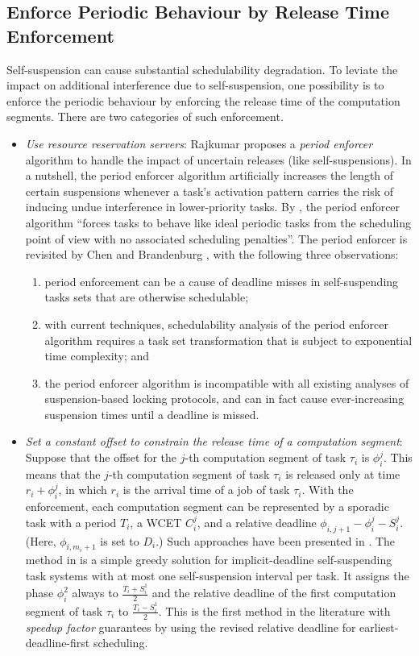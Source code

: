 \begin{table}[t]
\begin{table}[t]
\subsection{Enforce Periodic Behaviour by Release Time Enforcement}   Self-suspension can cause substantial schedulability degradation. To leviate the impact on additional interference due to self-suspension, one possibility is to enforce the periodic behaviour by enforcing the release time of the computation segments. There are two categories of such enforcement. 
  \begin{itemize}
  \item {\it Use resource reservation servers}: Rajkumar \cite{Raj:suspension1991} proposes a \emph{period enforcer} algorithm to handle the impact of uncertain releases (like self-suspensions). In a nutshell, the period enforcer algorithm artificially increases the length of certain suspensions whenever a task's activation pattern carries the risk of inducing undue interference in lower-priority tasks. By \cite{Raj:suspension1991}, the period enforcer algorithm ``forces tasks to behave like ideal periodic tasks from the scheduling point of view with no associated scheduling penalties''. The period enforcer is revisited by Chen and Brandenburg \cite{ChenBrandenburg}, with the following three observations:
\begin{enumerate}
	\item period enforcement can be a cause of deadline misses in self-suspending tasks sets that are otherwise schedulable;
	\item with current techniques, schedulability analysis of the period enforcer algorithm requires a task set transformation that is subject to exponential time complexity; and 	
        \item the period enforcer algorithm is incompatible with all existing analyses of suspension-based locking protocols, and can in fact cause ever-increasing suspension times until a deadline is missed.
\end{enumerate}
  \item {\it Set a constant offset to constrain the release time of a computation segment}: Suppose that the offset for the $j$-th computation segment of task $\tau_i$ is $\phi_i^j$. This means that the $j$-th computation segment of task $\tau_i$ is released only at time $r_i+\phi_i^j$, in which $r_i$ is the arrival time of a job of task $\tau_i$. With the enforcement, each computation segment can be represented by a sporadic task with a period $T_i$, a WCET $C_i^j$, and a relative deadline $\phi_{i,j+1}-\phi_i^j-S_i^j$. (Here, $\phi_{i,m_i+1}$ is set to $D_i$.) Such approaches have been presented in \cite{RTSS-KimANR13,LR:rtas10,RTSS-ChenL14}. The method in \cite{RTSS-ChenL14} is a simple greedy solution for implicit-deadline self-suspending task systems with at most one self-suspension interval per task. It assigns the phase $\phi_i^2$ always to $\frac{T_i+S_i^1}{2}$ and the relative deadline of the first computation segment of task $\tau_i$ to $\frac{T_i-S_i^1}{2}$. This is the first method in the literature with \emph{speedup factor} guarantees by using the revised relative deadline for earliest-deadline-first scheduling. 



\end{itemize}
\end{table}
\end{table}
